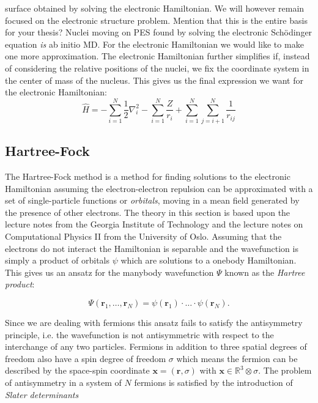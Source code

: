 surface obtained by solving the electronic Hamiltonian.
We will however remain focused on the electronic structure problem. {\color{red} Mention that this is the entire basis for your thesis? Nuclei moving on PES found by solving the electronic Schödinger equation \textit{is} ab initio MD.}
For the electronic Hamiltonian we would like to make one more
approximation.
The electronic Hamiltonian further simplifies if, instead
of considering the relative positions of the nuclei,
we fix the coordinate system in the center of mass of the nucleus.
This gives us the final expression we want for the electronic
Hamiltonian:
\begin{equation}
    \hat{H} = -\sum_{i=1}^N \frac{1}{2} \nabla_i^2
    - \sum_{i=1}^N \frac{Z}{r_{i}} + \sum_{i=1}^N \sum_{j=i+1}^N
    \frac{1}{r_{ij}}
\end{equation}

\subsection{Hartree-Fock}
The Hartree-Fock method is a method for finding
solutions to the electronic Hamiltonian assuming
the electron-electron repulsion can be approximated
with a set of single-particle functions or \textit{orbitals},
moving in a mean field generated by the presence of other electrons.
The theory in this section is based upon the \parencite[Sherrill]
{sherrill2000} lecture notes from the Georgia Institute of Technology
and the lecture notes
on Computational Physics II \parencite[Hjorth-Jensen]
{hjensen2019} from the University of Oslo.
Assuming that the electrons do not interact
the Hamiltonian is separable and the wavefunction
is simply a product of orbitals $\psi$
which are solutions to a onebody Hamiltonian.
This gives us an ansatz for the manybody wavefunction $\Psi$
known as the \textit{Hartree product}:

\begin{equation}
 \Psi(\bm{r}_1,\dots,\bm{r}_N) = \psi(\bm{r}_1) \cdot \dots
    \cdot \psi(\bm{r}_N) .
\end{equation}

Since we are dealing with fermions this ansatz fails to satisfy
the antisymmetry principle, i.e. the wavefunction
is not antisymmetric with respect to the interchange of any two
particles. Fermions in addition to three spatial degrees of freedom
also have a spin degree of freedom $\sigma$
which means the fermion can be described
by the space-spin coordinate $\bm{x} = (\bm{r}, \sigma)$
with $\bm{x} \in \mathbb{R}^3 \otimes \sigma$.
The problem of antisymmetry in a system of $N$ fermions
is satisfied by the introduction of \textit{Slater determinants}

